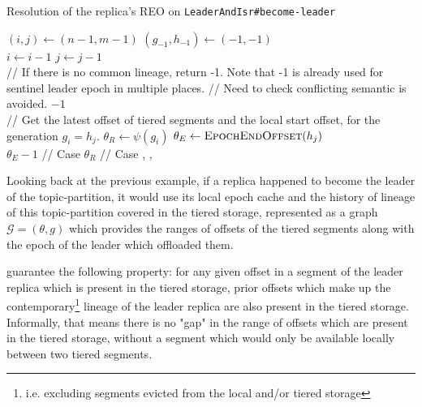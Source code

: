 \documentclass{article}
\newcommand*\circled[1]{\tikz[baseline=(char.base)]{
		\node[shape=circle,draw,inner sep=1pt] (char) {#1};}}
\begin{document}
\begin{algorithm}[h!]
	\caption{Resolution of the replica's REO on \texttt{LeaderAndIsr\#become-leader}}
	\label{alg:reo}
	
	\begin{algorithmic}[1]
			\State	$(i,j) \leftarrow (n-1,m-1)$
			\State	$(g_{-1}, h_{-1}) \leftarrow (-1,-1)$
			\\
					\State $i \leftarrow i - 1$
				\EndWhile
					\State $j \leftarrow j - 1$
				\EndWhile
			\EndWhile
			\\
			\State // If there is no common lineage, return -1. Note that -1 is already used for sentinel leader epoch in multiple places.
			\State // Need to check conflicting semantic is avoided.
				\State \Return $-1$
			\EndIf
			\\
			\State // Get the latest offset of tiered segments and the local start offset, for the generation $g_i = h_j$.
			\State $\theta_R \leftarrow \psi(g_i)$
			\State $\theta_E \leftarrow  \textsc{EpochEndOffset}(h_j)$
			\\
			\State \Return $\theta_E - 1$ // Case \circled{C}
			\Else
			\State \Return $\theta_R$ // Case \circled{A}, \circled{B}, \circled{D}
			\EndIf
			\\
		\EndFunction
	\end{algorithmic}	
\end{algorithm}

Looking back at the previous example, if a replica happened to become the leader of the topic-partition, it would use its local epoch cache and the history of lineage of this topic-partition covered in the tiered storage, represented as a graph $\mathcal{G}=(\theta,g)$ which provides the ranges of offsets of the tiered segments along with the epoch of the leader which offloaded them.

guarantee the following property: for any given offset in a segment of the leader replica which is present in the tiered storage, prior offsets which make up the contemporary\footnote{i.e. excluding segments evicted from the local and/or tiered storage} lineage of the leader replica are also present in the tiered storage. Informally, that means there is no "gap" in the range of offsets which are present in the tiered storage, without a segment which would only be available locally between two tiered segments.
\end{document}
